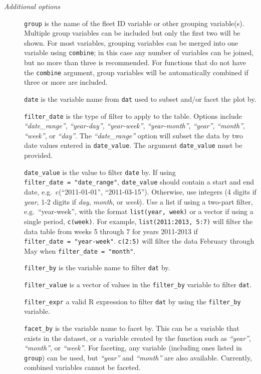 \documentclass[
]{article}
\begin{document}
\begin{description}
\item[\emph{Additional options}]
\texttt{group} is the name of the fleet ID variable or other grouping variable(s). Multiple group variables can be included but only the first two will be shown. For most variables, grouping variables can be merged into one variable using \texttt{combine}; in this case any number of variables can be joined, but no more than three is recommended. For functions that do not have the \texttt{combine} argument, group variables will be automatically combined if three or more are included.

\texttt{date} is the variable name from \texttt{dat} used to subset and/or facet the plot by.

\texttt{filter\_date} is the type of filter to apply to the table. Options include \emph{``date\_range''}, \emph{``year-day''}, \emph{``year-week''}, \emph{``year-month''}, \emph{``year''}, \emph{``month''}, \emph{``week''}, or \emph{``day''}. The \emph{``date\_range''} option will subset the data by two date values entered in \texttt{date\_value}. The argument \texttt{date\_value} must be provided.

\texttt{date\_value} is the value to filter \texttt{date} by. If using \texttt{filter\_date\ =\ "date\_range"}, \texttt{date\_value} should contain a start and end date, e.g.~c(``2011-01-01'', ``2011-03-15''). Otherwise, use integers (4 digits if \emph{year}, 1-2 digits if \emph{day}, \emph{month}, or \emph{week}). Use a list if using a two-part filter, e.g.~``year-week'', with the format \texttt{list(year,\ week)} or a vector if using a single period, \texttt{c(week)}. For example, \texttt{list(2011:2013,\ 5:7)} will filter the data table from weeks 5 through 7 for years 2011-2013 if \texttt{filter\_date\ =\ "year-week"}. \texttt{c(2:5)} will filter the data February through May when \texttt{filter\_date\ =\ "month"}.

\texttt{filter\_by} is the variable name to filter \texttt{dat} by.

\texttt{filter\_value} is a vector of values in the \texttt{filter\_by} variable to filter \texttt{dat}.

\texttt{filter\_expr} a valid R expression to filter \texttt{dat} by using the \texttt{filter\_by} variable.

\texttt{facet\_by} is the variable name to facet by. This can be a variable that exists in the dataset, or a variable created by the function such as \emph{``year''}, \emph{``month''}, or \emph{``week''}. For faceting, any variable (including ones listed in \texttt{group}) can be used, but \emph{``year''} and \emph{``month''} are also available. Currently, combined variables cannot be faceted.


\end{description}
\end{document}
